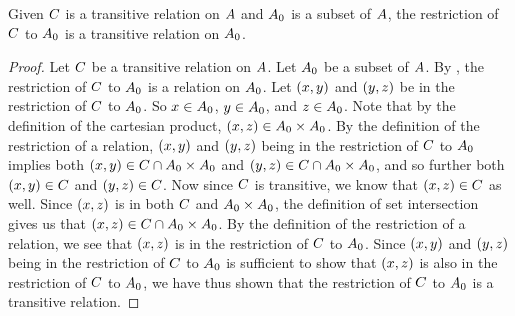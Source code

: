\documentclass[../main.tex]{subfiles}
\begin{document}
\begin{thm}
	Given \({C}\) is a transitive relation on \({A}\) and
	\({A_0}\) is a subset of \({A}\), the restriction of
	\({C}\) to \({A_0}\) is a transitive relation on
	\({A_0}\).
\end{thm}
\begin{proof}
	Let \({C}\) be a transitive relation on \({A}\). Let
	\({A_0}\) be a subset of \({A}\). By ,
	the restriction of \({C}\) to \({A_0}\) is a relation
	on \({A_0}\). Let \(({x},{y})\) and \(({y},{z})\) be in
	the restriction of \({C}\) to \({A_0}\). So
	\(x \in {A_0}\), \(y \in {A_0}\), and
	\(z \in {A_0}\). Note that by the definition of the cartesian
	product,
	\(({x},{z}) \in {{A_0}} \times {{A_0}}\).
	By the definition of the restriction of a relation, \(({x},{y})\)
	and \(({y},{z})\) being in the restriction of \({C}\)
	to \({A_0}\) implies both
	\(({x},{y}) \in {{C}} \cap {{{A_0}} \times{{A_0}}}\)
	and
	\(({y},{z}) \in {{C}} \cap {{{A_0}} \times{{A_0}}}\),
	and so further both \(({x},{y}) \in {C}\) and
	\(({y},{z}) \in {C}\). Now since \({C}\)
	is transitive, we know that \(({x},{z}) \in {C}\) as
	well. Since \(({x},{z})\) is in both \({C}\) and
	\({{A_0}} \times {{A_0}}\), the definition
	of set intersection gives us that
	\(({x},{z}) \in {{C}} \cap {{{A_0}} \times{{A_0}}}\).
	By the definition of the restriction of a relation, we see that
	\(({x},{z})\) is in the restriction of \({C}\) to
	\({A_0}\). Since \(({x},{y})\) and \(({y},{z})\) being
	in the restriction of \({C}\) to \({A_0}\) is
	sufficient to show that \(({x},{z})\) is also in the restriction of
	\({C}\) to \({A_0}\), we have thus shown that the
	restriction of \({C}\) to \({A_0}\) is a transitive
	relation.
\end{proof}
\end{document}

